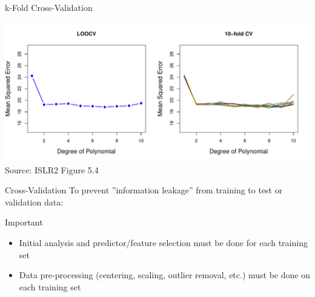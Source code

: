 \documentclass[ignorenonframetext,xcolor=x11names]{beamer}
\begin{document}
\begin{frame}{k-Fold Cross-Validation}
\centering

\includegraphics[width=\textwidth]{Figures_Chapters_1-6/Chapter5/5_4.pdf}
\scriptsize Source: ISLR2 Figure 5.4
\end{frame}


\begin{frame}{Cross-Validation}
To prevent ''information leakage'' from training to test or validation data:
\begin{block}{Important}
\begin{itemize}
  \item Initial analysis and predictor/feature selection must be done for each training set
  \item Data pre-processing (centering, scaling, outlier removal, etc.) must be done on each training set
\end{itemize}
\end{block}
\end{frame}
\end{document}
